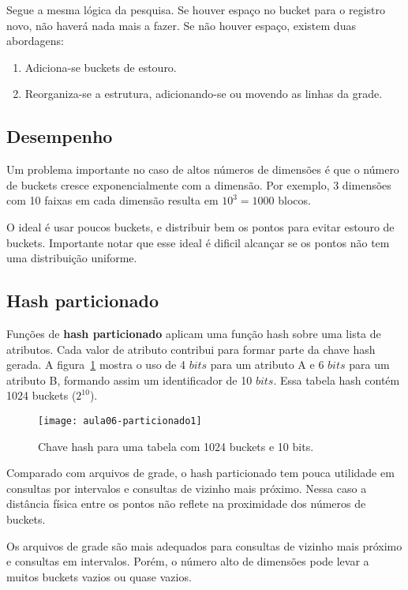 Segue a mesma lógica da pesquisa. Se houver espaço no bucket para o registro novo,
não haverá nada mais a fazer.
Se não houver espaço, existem duas abordagens:
\begin{enumerate}
\item Adiciona-se buckets de estouro.
\item Reorganiza-se a estrutura, adicionando-se ou movendo as linhas da grade.
\end{enumerate}

\subsection{Desempenho}

Um problema importante no caso de altos números de dimensões é que o número de buckets
cresce exponencialmente com a dimensão. Por exemplo, 3 dimensões com 10 faixas em cada dimensão
resulta em $10^3 = 1000$ blocos.

O ideal é usar poucos buckets, e distribuir bem os pontos para evitar estouro
de buckets.  Importante notar que esse ideal é dificil alcançar se os pontos
não tem uma distribuição uniforme.

\subsection{Hash particionado}

Funções de \textbf{hash particionado} aplicam uma função hash sobre uma lista
de atributos.
Cada valor de atributo contribui para formar parte da chave hash gerada.
A figura~\ref{aula06:fig:particionado1} mostra o uso de 4 $bits$ para um atributo A
e  6 $bits$ para um atributo B, formando assim um identificador de 10 $bits$.
Essa tabela hash contém 1024 buckets ($2^{10}$).
%
\begin{figure}[!htb]
\centering
\texttt{[image: aula06-particionado1]}
\caption{Chave hash para uma tabela com 1024 buckets e 10 bits.}
\label{aula06:fig:particionado1}
\end{figure}

Comparado com arquivos de grade, o hash particionado tem pouca utilidade em
consultas por intervalos e consultas de vizinho mais próximo.
Nessa caso a distância física entre os pontos não reflete na proximidade dos números
de buckets.

Os arquivos de grade são mais adequados para consultas de vizinho mais próximo e consultas
em intervalos. Porém, o número alto de dimensões pode levar a muitos buckets vazios ou
quase vazios.

